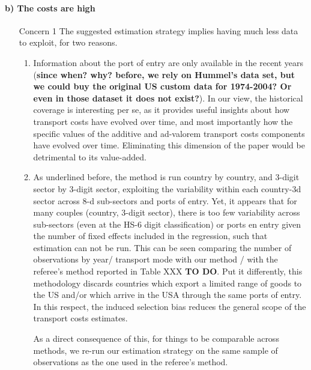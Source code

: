 \documentclass[a4paper,12pt]{article}
\begin{document}
\paragraph{b) The costs are high}
\begin{itemize}
\item[Concern 1] The suggested estimation strategy implies having much less data to exploit, for two reasons.
\begin{enumerate}
\item Information about the port of entry are only available in the recent years (\textbf{since when? why? before, we rely on Hummel's data set, but we could buy the original US custom data for 1974-2004? Or even in those dataset it does not exist?}). In our view, the historical coverage is interesting per se, as it provides useful insights about how transport costs have evolved over time, and most importantly how the specific values of the additive and ad-valorem transport costs components have evolved over time. Eliminating this dimension of the paper would be detrimental to its value-added.
\item As underlined before, the method is run country by country, and 3-digit sector by 3-digit sector, exploiting the variability within each country-3d sector across 8-d sub-sectors and ports of entry. Yet, it appears that for many couples (country, 3-digit sector), there is too few variability across sub-sectors (even at the HS-6 digit classification) or ports en entry given the number of fixed effects included in the regression, such that estimation can not be run. This can be seen comparing the number of observations by year/ transport mode with our method / with the referee's method reported in Table XXX \textbf{TO DO}. Put it differently, this methodology discards countries which export a limited range of goods to the US and/or which arrive in the USA through the same ports of entry. In this respect, the induced selection bias reduces the general scope of the transport costs estimates. 
    
    As a direct consequence of this, for things to be comparable across methods, we re-run our estimation strategy on the same sample of observations as the one used in the referee's method. 


\end{enumerate}
\end{itemize}
\end{document}
